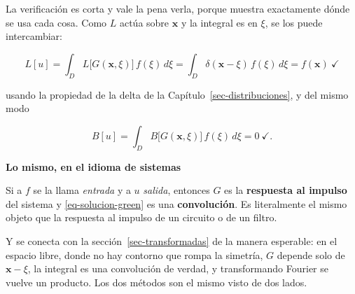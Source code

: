 \documentclass[
  spanish,
  a4paper,
]{scrbook}
\theoremstyle{definition}
\theoremstyle{plain}
\theoremstyle{definition}
\theoremstyle{plain}
\theoremstyle{definition}
\theoremstyle{remark}
\begin{document}
La verificación es corta y vale la pena verla, porque muestra
exactamente dónde se usa cada cosa. Como \(L\) actúa sobre
\(\mathbf{x}\) y la integral es en \(\xi\), se los puede intercambiar:

\[
L[u] = \int_D L\big[G(\mathbf{x},\xi)\big]\,f(\xi)\,d\xi
= \int_D \delta(\mathbf{x}-\xi)\,f(\xi)\,d\xi = f(\mathbf{x}) \ \checkmark
\]

usando la propiedad de la delta de la Capítulo~\ref{sec-distribuciones},
y del mismo modo

\[
B[u] = \int_D B\big[G(\mathbf{x},\xi)\big]\,f(\xi)\,d\xi = 0 \ \checkmark .
\]

\begin{tcolorbox}[enhanced jigsaw, arc=.35mm, bottomrule=.15mm, breakable, colback=white, colframe=quarto-callout-tip-color-frame, left=2mm, leftrule=.75mm, opacityback=0, rightrule=.15mm, toprule=.15mm]
\begin{minipage}[t]{5.5mm}
\textcolor{quarto-callout-tip-color}{\faLightbulb}
\end{minipage}%
\begin{minipage}[t]{\textwidth - 5.5mm}

\vspace{-3mm}\textbf{Lo mismo, en el idioma de sistemas}\vspace{3mm}

Si a \(f\) se la llama \emph{entrada} y a \(u\) \emph{salida}, entonces
\(G\) es la \textbf{respuesta al impulso} del sistema y
\ref{eq-solucion-green} es una \textbf{convolución}. Es literalmente el
mismo objeto que la respuesta al impulso de un circuito o de un filtro.

Y se conecta con la sección~\ref{sec-transformadas} de la manera
esperable: en el espacio libre, donde no hay contorno que rompa la
simetría, \(G\) depende solo de \(\mathbf{x}-\xi\), la integral es una
convolución de verdad, y transformando Fourier se vuelve un producto.
Los dos métodos son el mismo visto de dos lados.

\end{minipage}%
\end{tcolorbox}
\end{document}
